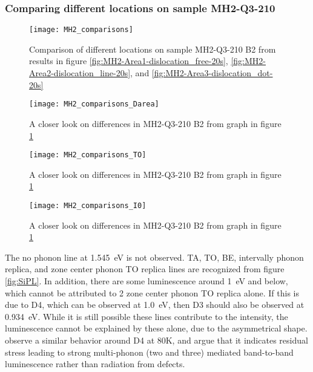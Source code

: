 \subsubsection{Comparing different locations on sample MH2-Q3-210}

\begin{figure}[H]
\centering
\texttt{[image: MH2\_comparisons]}
\caption[MH2-Q3-210 comparisons]{Comparison of different locations on sample MH2-Q3-210 B2 from results in figure \ref{fig:MH2-Area1-dislocation_free-20s}, \ref{fig:MH2-Area2-dislocation_line-20s}, and \ref{fig:MH2-Area3-dislocation_dot-20s} }
\label{fig:MH2_comparisons}%
\end{figure}


\begin{figure}[H]
\centering
\texttt{[image: MH2\_comparisons\_Darea]}
\caption[MH2-Q3-210 comparisons close]{A closer look on differences in MH2-Q3-210 B2 from graph in figure \ref{fig:MH2_comparisons} }
\label{fig:MH2_comparisons_Darea}%
\end{figure}

\begin{figure}[H]
\centering
\texttt{[image: MH2\_comparisons\_TO]}
\caption[MH2-Q3-210 comparisons close]{A closer look on differences in MH2-Q3-210 B2 from graph in figure \ref{fig:MH2_comparisons} } 
\label{fig:MH2_comparisons_TO}%
\end{figure}

\begin{figure}[H]
\centering
\texttt{[image: MH2\_comparisons\_I0]}
\caption[MH2-Q3-210 comparisons close]{A closer look on differences in MH2-Q3-210 B2 from graph in figure \ref{fig:MH2_comparisons} } 
\label{fig:MH2_comparisons_I0}%
\end{figure}


The no phonon line at 1.545~eV is not observed. TA, TO, BE, intervally phonon replica, and zone center phonon TO replica lines are recognized from figure \ref{fig:SiPL}. In addition, there are some luminescence around 1~eV and below, which cannot be attributed to 2 zone center phonon TO replica alone. If this is due to D4, which can be observed at 1.0~eV, then D3 should also be observed at 0.934~eV. While it is still possible these lines contribute to the intensity, the luminescence cannot be explained by these alone, due to the asymmetrical shape. \cite{arguirov07} observe a similar behavior around D4 at 80K, and argue that it indicates residual stress leading to strong multi-phonon (two and three) mediated band-to-band luminescence rather than radiation from defects.



